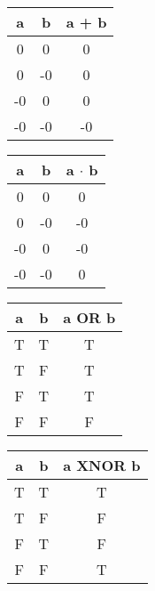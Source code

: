 \documentclass[12pt]{report}
\theoremstyle{definition}
\theoremstyle{remark}
\begin{document}
    \begin{minipage}{0.2\textwidth}
      \begin{center}
        \begin{tabular}{| c | c || c |} \hline
          a & b & a + b \\ \hline
          0 & 0 & 0 \\ \hline
          0 & -0 & 0 \\ \hline
          -0 & 0 & 0 \\ \hline
          -0 & -0 & -0 \\ \hline
        \end{tabular}
      \end{center}
    \end{minipage}
    \begin{minipage}{0.25\textwidth}
      \begin{center}
        \begin{tabular}{| c | c || c |} \hline
          a & b & a $\cdot$ b \\ \hline
          0 & 0 & 0 \\ \hline
          0 & -0 & -0 \\ \hline
          -0 & 0 & -0 \\ \hline
          -0 & -0 & 0 \\ \hline
        \end{tabular}
      \end{center}
    \end{minipage}
    \begin{minipage}{0.25\textwidth}
      \begin{center}
        \begin{tabular}{| c | c || c |} \hline
          a & b & a OR b \\ \hline
          T & T & T \\ \hline
          T & F & T \\ \hline
          F & T & T \\ \hline
          F & F & F \\ \hline
        \end{tabular}
      \end{center}
    \end{minipage}
    \begin{minipage}{0.25\textwidth}
      \begin{center}
        \begin{tabular}{| c | c || c |} \hline
          a & b & a XNOR b \\ \hline
          T & T & T \\ \hline
          T & F & F \\ \hline
          F & T & F \\ \hline
          F & F & T \\ \hline
        \end{tabular}
      \end{center}
    \end{minipage}\\\\
\newpage
\end{document}
